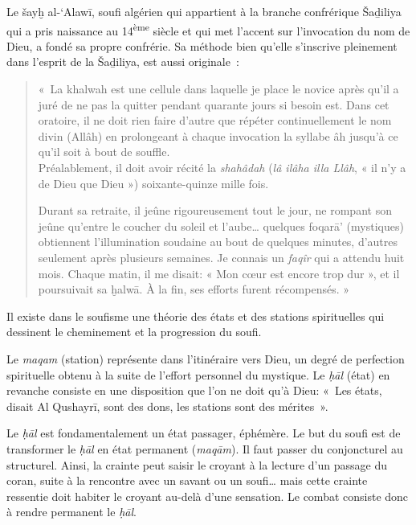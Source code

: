 Le šayḫ al-`Alawī, soufi algérien qui appartient à la branche
confrérique Šaḏiliya qui a pris naissance au 14\textsuperscript{ème}
siècle et qui met l'accent sur l'invocation du nom de Dieu, a fondé sa
propre confrérie. Sa méthode bien qu'elle s'inscrive pleinement dans
l'esprit de la Šaḏiliya, est aussi originale~:

\begin{quote}
«~La khalwah est une cellule dans laquelle je place le novice après
qu'il a juré de ne pas la quitter pendant quarante jours si besoin est.
Dans cet oratoire, il ne doit rien faire d'autre que répéter
continuellement le nom divin (Allâh) en prolongeant à chaque invocation
la syllabe âh jusqu'à ce qu'il soit à bout de souffle.\\
Préalablement, il doit avoir récité la \emph{shahâdah} (\emph{lâ ilâha
illa Llâh}, « il n'y a de Dieu que Dieu ») soixante-quinze mille fois.

Durant sa retraite, il jeûne rigoureusement tout le jour, ne rompant son
jeûne qu'entre le coucher du soleil et l'aube\ldots{} quelques foqarā'
(mystiques) obtiennent l'illumination soudaine au bout de quelques
minutes, d'autres seulement après plusieurs semaines. Je connais un
\emph{faqîr} qui a attendu huit mois. Chaque matin, il me disait: « Mon
cœur est encore trop dur », et il poursuivait sa ḫalwā. À la fin, ses
efforts furent récompensés. »
\end{quote}


Il existe dans le soufisme une théorie des états et des stations
spirituelles qui dessinent le cheminement et la progression du soufi.

Le \emph{maqam} (station) représente dans l'itinéraire vers Dieu, un
degré de perfection spirituelle obtenu à la suite de l'effort personnel
du mystique. Le \emph{ḥāl} (état) en revanche consiste en une
disposition que l'on ne doit qu'à Dieu: «~Les états, disait Al Qushayrī,
sont des dons, les stations sont des mérites~».

Le \emph{ḥāl} est fondamentalement un état passager, éphémère. Le but du
soufi est de transformer le \emph{ḥāl} en état permanent (\emph{maqām}).
Il faut passer du conjoncturel au structurel. Ainsi, la crainte peut
saisir le croyant à la lecture d'un passage du coran, suite à la
rencontre avec un savant ou un soufi\ldots{} mais cette crainte
ressentie doit habiter le croyant au-delà d'une sensation. Le combat
consiste donc à rendre permanent le \emph{ḥāl}.

